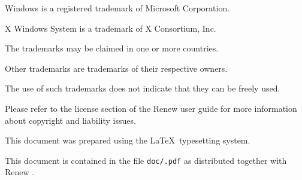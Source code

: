 \begin{tiny}
\begin{flushleft}
Windows is a registered trademark of Microsoft Corporation.

X Windows System is a trademark of X Consortium, Inc.

\bigskip

The trademarks may be claimed in one or more countries.

Other trademarks are trademarks of their respective owners.

The use of such trademarks does not indicate that they can be freely
used.

\bigskip

Please refer to the license section of the Renew user guide
for more information about copyright and liability
issues.

\bigskip

This document was prepared using the \LaTeX\ typesetting system.

This document is contained in the file
\texttt{doc/\jobname.pdf} as distributed together
with Renew \renewversion.
\end{flushleft}
\end{tiny}
\thispagestyle{empty}
\clearpage

